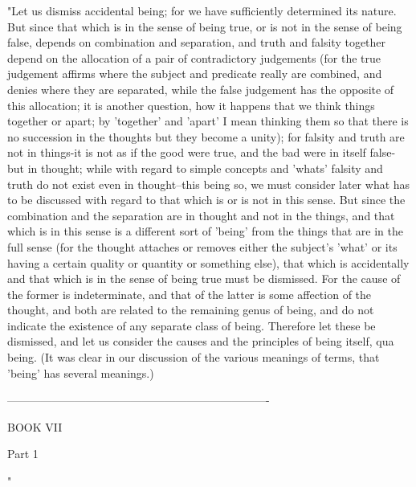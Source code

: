 "Let us dismiss accidental being; for we have sufficiently determined
its nature. But since that which is in the sense of being true, or
is not in the sense of being false, depends on combination and separation,
and truth and falsity together depend on the allocation of a pair
of contradictory judgements (for the true judgement affirms where
the subject and predicate really are combined, and denies where they
are separated, while the false judgement has the opposite of this
allocation; it is another question, how it happens that we think things
together or apart; by 'together' and 'apart' I mean thinking them
so that there is no succession in the thoughts but they become a unity);
for falsity and truth are not in things-it is not as if the good were
true, and the bad were in itself false-but in thought; while with
regard to simple concepts and 'whats' falsity and truth do not exist
even in thought--this being so, we must consider later what has to
be discussed with regard to that which is or is not in this sense.
But since the combination and the separation are in thought and not
in the things, and that which is in this sense is a different sort
of 'being' from the things that are in the full sense (for the thought
attaches or removes either the subject's 'what' or its having a certain
quality or quantity or something else), that which is accidentally
and that which is in the sense of being true must be dismissed. For
the cause of the former is indeterminate, and that of the latter is
some affection of the thought, and both are related to the remaining
genus of being, and do not indicate the existence of any separate
class of being. Therefore let these be dismissed, and let us consider
the causes and the principles of being itself, qua being. (It was
clear in our discussion of the various meanings of terms, that 'being'
has several meanings.) 

----------------------------------------------------------------------

BOOK VII

Part 1 

"

